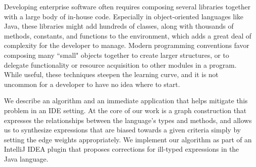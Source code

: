 Developing enterprise software often requires composing several libraries together with a large body of in-house code. Especially in object-oriented languages like Java, these libraries might add hundreds of classes, along with thousands of methods, constants, and functions to the environment, which adds a great deal of complexity for the developer to manage. Modern programming conventions favor composing many ``small" objects together to create larger structures, or to delegate functionality or resource acquisition to other modules in a program. While useful, these techniques steepen the learning curve, and it is not uncommon for a developer to have no idea where to start.

We describe an algorithm and an immediate application that helps mitigate this problem in an IDE setting. At the core of our work is a graph construction that expresses the relationships between the language's types and methods, and allows us to synthesize expressions that are biased towards a given criteria simply by setting the edge weights appropriately. We implement our algorithm as part of an IntelliJ IDEA plugin that proposes corrections for ill-typed expressions in the Java language.